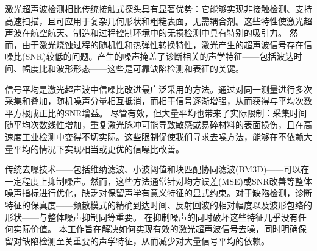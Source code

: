 激光超声波检测相比传统接触式探头具有显著优势：它能够实现非接触检测、支持高速扫描，且可应用于复杂几何形状和粗糙表面，无需耦合剂\cite{liu2022deep}。这些特性使激光超声波在航空航天、制造和过程控制环境中的无损检测中具有特别的吸引力。
然而，由于激光烧蚀过程的随机性和热弹性转换特性，激光产生的超声波信号存在信噪比(SNR)较低的问题\cite{zhang2020deep}。产生的噪声掩盖了诊断相关的声学特征——包括波达时间、幅度比和波形形态——这些是可靠缺陷检测和表征的关键\cite{chen2019wavelet}。

信号平均是激光超声波中信噪比改进最广泛采用的方法\cite{zhang2020deep}。通过对同一测量进行多次采集和叠加，随机噪声分量相互抵消，而相干信号逐渐增强，从而获得与平均次数平方根成正比的SNR增益。
尽管有效，但大量平均也带来了实际限制：采集时间随平均次数线性增加，重复激光脉冲可能导致敏感或易碎材料的表面损伤，且在高速度工业检测中变得不切实际\cite{yang2023unsupervised}。这些限制促使我们寻求去噪方法，能够在不依赖大量平均的情况下实现相当或更优的信噪比改善。

传统去噪技术——包括维纳滤波、小波阈值和块匹配协同滤波(BM3D)——可以在一定程度上抑制噪声\cite{dabov2007bm3d, chen2019wavelet}。然而，这些方法通常针对均方误差(MSE)或SNR改善等整体噪声指标进行优化，缺乏对保留声学有意义特征的显式约束\cite{yang2023unsupervised}。对于缺陷检测，诊断特征的保真度——频散模式的精确到达时间、反射回波的相对幅度以及波形包络的形状——与整体噪声抑制同等重要。
在抑制噪声的同时破坏这些特征几乎没有任何实际价值。
本工作旨在解决如何实现有效的激光超声波信号去噪，同时明确保留对缺陷检测至关重要的声学特征，从而减少对大量信号平均的依赖。